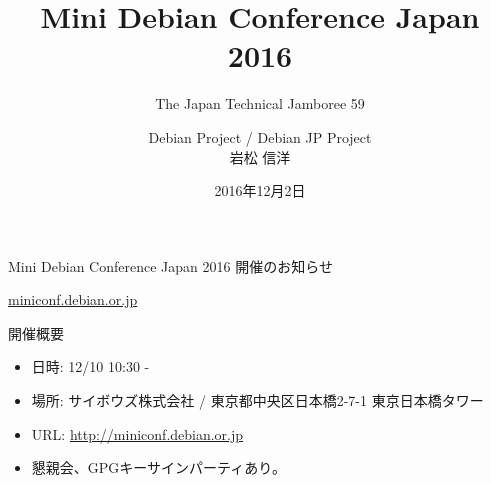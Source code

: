 \title{Mini Debian Conference Japan 2016}
\subtitle{The Japan Technical Jamboree 59}
\author{Debian Project / Debian JP Project \\岩松 信洋}
\date{2016年12月2日}



\begin{frame}
\titlepage{}
\end{frame}

\begin{frame}
\begin{center}
\Huge{Mini Debian Conference Japan 2016 開催のお知らせ}
\end{center}
\end{frame}

\begin{frame}
\begin{center}
\Huge{\url{miniconf.debian.or.jp}}
\end{center}
\end{frame}

\begin{frame}{開催概要}
  \begin{itemize}
   \item 日時: 12/10 10:30 - 
   \item 場所: サイボウズ株式会社 / 東京都中央区日本橋2-7-1 東京日本橋タワー
   \item URL: \url{http://miniconf.debian.or.jp}
   \item 懇親会、GPGキーサインパーティあり。
  \end{itemize}
\end{frame}

